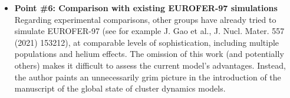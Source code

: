\documentclass{article}
\newif\ifshowauthornotes
\newcommand{\authornote}[1]{\ifshowauthornotes{\color{red}\ [\textbf{Author action:} #1]}\fi}
\begin{document}
\begin{itemize}
\authornote{Verify the explanation of the kinks at $n\approx 20$ (SIA) and $n\approx 50$ (vacancy) against the configuration used for the original Figure~6 (source cutoffs $i_{\rm cascade}$, $v_{\rm cascade}$ and the original $i_{\rm discrete}$, $v_{\rm discrete}$), and correct the two bullets above if needed.}

\item \textbf{Point \#6: Comparison with existing EUROFER-97 simulations}\\
Regarding experimental comparisons, other groups have already tried to simulate EUROFER-97 (see for example J. Gao et al., J. Nucl. Mater. 557 (2021) 153212), at comparable levels of sophistication, including multiple populations and helium effects. The omission of this work (and potentially others) makes it difficult to assess the current model's advantages. Instead, the author paints an unnecessarily grim picture in the introduction of the manuscript of the global state of cluster dynamics models.\\


\end{itemize}
\end{document}
